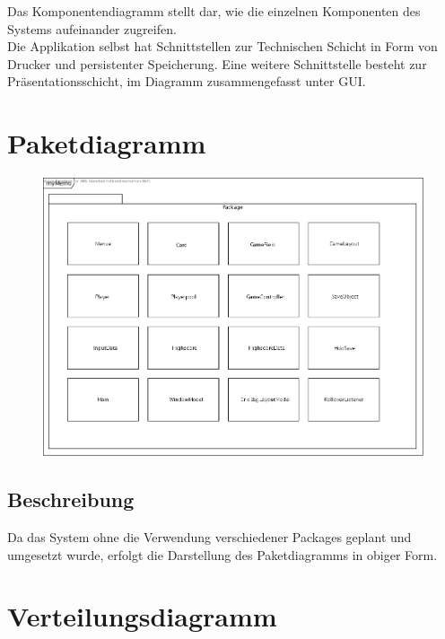 Das Komponentendiagramm stellt dar, wie die einzelnen Komponenten des Systems aufeinander zugreifen.\\
Die Applikation selbst hat Schnittstellen zur Technischen Schicht in Form von Drucker und persistenter Speicherung. Eine weitere Schnittstelle besteht zur Präsentationsschicht, im Diagramm zusammengefasst unter GUI.



\clearpage
\section{Paketdiagramm}

\begin{figure}[!h]
	\centering
    \includegraphics[width=\textwidth]{./paketdiagramm.png}
	\label{layout_gesamt}
\end{figure}
\subsection{Beschreibung}
Da das System ohne die Verwendung verschiedener Packages geplant und umgesetzt wurde, erfolgt die Darstellung des Paketdiagramms in obiger Form.


\clearpage
\section{Verteilungsdiagramm}

